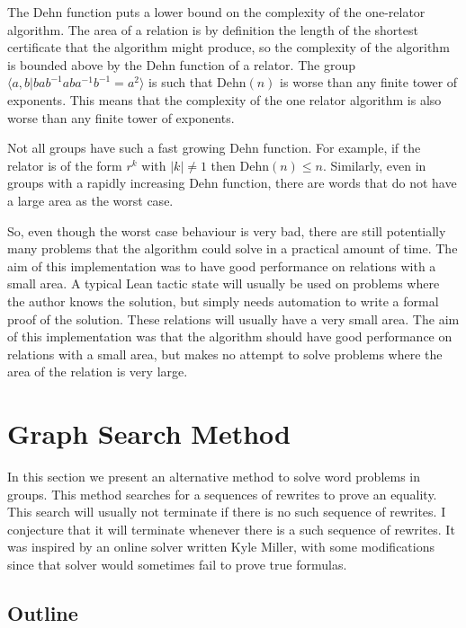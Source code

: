 \documentclass[11pt]{article} %
\theoremstyle{definition}
\theoremstyle{definition}
\theoremstyle{definition}
\theoremstyle{definition}
\theoremstyle{definition}
\theoremstyle{definition}
\begin{document}
  The Dehn function puts a lower bound on the complexity of the one-relator algorithm.
  The area of a relation is by definition the length of the shortest certificate
  that the algorithm might produce, so the complexity of the algorithm is bounded above by
  the Dehn function of a relator.
  The group $\langle a, b | b a b^{-1} a b a^{-1} b^{-1} = a^2\rangle$ is such that
  $\text{Dehn}(n)$ is worse than any finite tower of exponents. This means that the
  complexity of the one relator algorithm is also worse than any finite tower of
  exponents.

  Not all groups have such a fast growing Dehn function. For example, if the relator
  is of the form $r^k$ with $|k| \ne 1$ then $\text{Dehn}(n) \le n$.
  Similarly, even in groups with a rapidly increasing Dehn function,
  there are words that do not have a large area as the worst case.

  So, even though the worst case behaviour is very bad, there are still potentially many
  problems that the algorithm could solve in a practical amount of time. The aim of this
  implementation was to have good performance on relations with a small area.
  A typical Lean tactic state will usually be used on problems where the author knows
  the solution, but simply needs automation to write a formal proof of the solution.
  These relations will usually have a very small area. The aim of this implementation
  was that the algorithm should have good performance on relations with a small area,
  but makes no attempt to solve problems where the area of the relation is very large.

\section{Graph Search Method}

  In this section we present an alternative method to solve word problems in groups.
  This method searches for a sequences of rewrites to prove an equality. This search will
  usually not terminate if there is no such sequence of rewrites. I conjecture that it
  will terminate whenever there is a such sequence of rewrites. It was inspired by an
  online solver written Kyle Miller, with some modifications since that solver
  would sometimes fail to prove true formulas.

\subsection{Outline}
\end{document}
